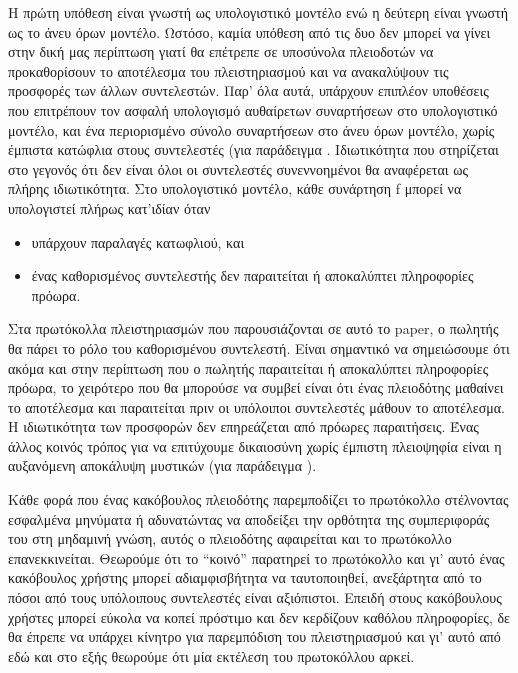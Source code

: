 \documentclass[letterpaper,11pt]{article}
\begin{document}
Η πρώτη υπόθεση είναι γνωστή ως υπολογιστικό μοντέλο ενώ η δεύτερη είναι γνωστή ως το άνευ όρων μοντέλο.
Ωστόσο, καμία υπόθεση από τις δυο δεν μπορεί να γίνει στην δική μας περίπτωση γιατί θα επέτρεπε σε υποσύνολα
πλειοδοτών να προκαθορίσουν το αποτέλεσμα του πλειστηριασμού και να ανακαλύψουν τις προσφορές των άλλων
συντελεστών. Παρ' όλα αυτά, υπάρχουν επιπλέον υποθέσεις που επιτρέπουν τον ασφαλή υπολογισμό αυθαίρετων
συναρτήσεων στο υπολογιστικό μοντέλο, και ένα περιορισμένο σύνολο συναρτήσεων στο άνευ όρων μοντέλο, χωρίς
έμπιστα κατώφλια στους συντελεστές (για παράδειγμα \cite{Goldreich,GL,Pass}. Ιδιωτικότητα που στηρίζεται στο γεγονός ότι δεν είναι όλοι οι συντελεστές
συνεννοημένοι θα αναφέρεται ως πλήρης ιδιωτικότητα. Στο υπολογιστικό μοντέλο, κάθε συνάρτηση f μπορεί να
υπολογιστεί πλήρως κατ'ιδίαν όταν 
\begin{itemize}
	\item υπάρχουν παραλαγές κατωφλιού, και 
	\item ένας καθορισμένος συντελεστής δεν παραιτείται ή αποκαλύπτει πληροφορίες πρόωρα.
\end{itemize}

Στα πρωτόκολλα πλειστηριασμών που παρουσιάζονται σε αυτό το paper, ο πωλητής θα πάρει το ρόλο του καθορισμένου
συντελεστή. Είναι σημαντικό να σημειώσουμε ότι ακόμα και στην περίπτωση που ο πωλητής παραιτείται ή
αποκαλύπτει πληροφορίες πρόωρα, το χειρότερο που θα μπορούσε να συμβεί είναι ότι ένας πλειοδότης μαθαίνει το
αποτέλεσμα και παραιτείται πριν οι υπόλοιποι συντελεστές μάθουν το αποτέλεσμα. Η ιδιωτικότητα των προσφορών
δεν επηρεάζεται από πρόωρες παραιτήσεις. Ένας άλλος κοινός τρόπος για να επιτύχουμε δικαιοσύνη χωρίς έμπιστη
πλειοψηφία είναι η αυξανόμενη αποκάλυψη μυστικών (για παράδειγμα \cite{GMY,GL,Yao}).

Κάθε φορά που ένας κακόβουλος πλειοδότης παρεμποδίζει το πρωτόκολλο στέλνοντας εσφαλμένα μηνύματα ή
αδυνατώντας να αποδείξει την ορθότητα της συμπεριφοράς του στη μηδαμινή γνώση, αυτός ο πλειοδότης αφαιρείται
και το πρωτόκολλο επανεκκινείται. Θεωρούμε ότι το “κοινό” παρατηρεί το πρωτόκολλο και γι’ αυτό ένας κακόβουλος
χρήστης μπορεί αδιαμφισβήτητα να ταυτοποιηθεί, ανεξάρτητα από το πόσοι από τους υπόλοιπους συντελεστές είναι
αξιόπιστοι. Επειδή στους κακόβουλους χρήστες μπορεί εύκολα να κοπεί πρόστιμο και δεν κερδίζουν καθόλου
πληροφορίες, δε θα έπρεπε να υπάρχει κίνητρο για παρεμπόδιση του πλειστηριασμού και γι’ αυτό από εδώ και στο
εξής θεωρούμε ότι μία εκτέλεση του πρωτοκόλλου αρκεί.
\end{document}

